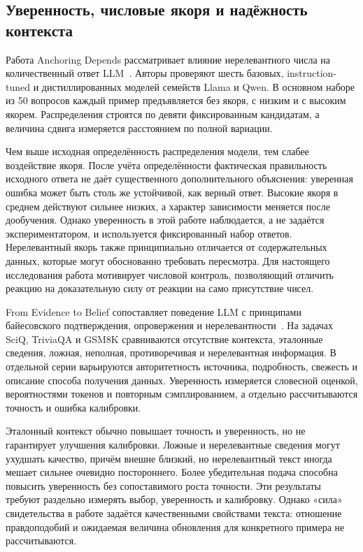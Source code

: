 \documentclass[a4paper,14pt]{extarticle}
\begin{document}
\subsection{Уверенность, числовые якоря и надёжность контекста}

Работа Anchoring Depends рассматривает влияние нерелевантного числа на количественный ответ LLM~\cite{anchoring}. Авторы проверяют шесть базовых, instruction-tuned и дистиллированных моделей семейств Llama и Qwen. В основном наборе из 50 вопросов каждый пример предъявляется без якоря, с низким и с высоким якорем. Распределения строятся по девяти фиксированным кандидатам, а величина сдвига измеряется расстоянием по полной вариации.

Чем выше исходная определённость распределения модели, тем слабее воздействие якоря. После учёта определённости фактическая правильность исходного ответа не даёт существенного дополнительного объяснения: уверенная ошибка может быть столь же устойчивой, как верный ответ. Высокие якоря в среднем действуют сильнее низких, а характер зависимости меняется после дообучения. Однако уверенность в этой работе наблюдается, а не задаётся экспериментатором, и используется фиксированный набор ответов. Нерелевантный якорь также принципиально отличается от содержательных данных, которые могут обоснованно требовать пересмотра. Для настоящего исследования работа мотивирует числовой контроль, позволяющий отличить реакцию на доказательную силу от реакции на само присутствие чисел.

From Evidence to Belief сопоставляет поведение LLM с принципами байесовского подтверждения, опровержения и нерелевантности~\cite{evidencetobelief}. На задачах SciQ, TriviaQA и GSM8K сравниваются отсутствие контекста, эталонные сведения, ложная, неполная, противоречивая и нерелевантная информация. В отдельной серии варьируются авторитетность источника, подробность, свежесть и описание способа получения данных. Уверенность измеряется словесной оценкой, вероятностями токенов и повторным сэмплированием, а отдельно рассчитываются точность и ошибка калибровки.

Эталонный контекст обычно повышает точность и уверенность, но не гарантирует улучшения калибровки. Ложные и нерелевантные сведения могут ухудшать качество, причём внешне близкий, но нерелевантный текст иногда мешает сильнее очевидно постороннего. Более убедительная подача способна повысить уверенность без сопоставимого роста точности. Эти результаты требуют раздельно измерять выбор, уверенность и калибровку. Однако «сила» свидетельства в работе задаётся качественными свойствами текста: отношение правдоподобий и ожидаемая величина обновления для конкретного примера не рассчитываются.
\end{document}
